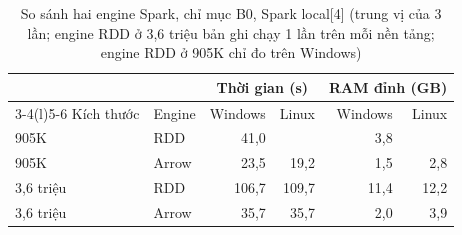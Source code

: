 \begin{table}[htbp]
\centering
\caption[So sánh hai engine Spark]{So sánh hai engine Spark, chỉ mục B0, Spark local[4] (trung vị của 3 lần; engine RDD ở 3,6 triệu bản ghi chạy 1 lần trên mỗi nền tảng; engine RDD ở 905K chỉ đo trên Windows)}\label{tab:engines}
\begin{tabular}{@{}llrrrr@{}}
\toprule
& & \multicolumn{2}{c}{Thời gian (s)} & \multicolumn{2}{c}{RAM đỉnh (GB)} \\
\cmidrule(lr){3-4}\cmidrule(l){5-6}
Kích thước & Engine & Windows & Linux & Windows & Linux \\
\midrule
905K & RDD & 41,0 &  & 3,8 &  \\
905K & Arrow & 23,5 & 19,2 & 1,5 & 2,8 \\
3,6 triệu & RDD & 106,7 & 109,7 & 11,4 & 12,2 \\
3,6 triệu & Arrow & 35,7 & 35,7 & 2,0 & 3,9 \\
\bottomrule
\end{tabular}
\end{table}

